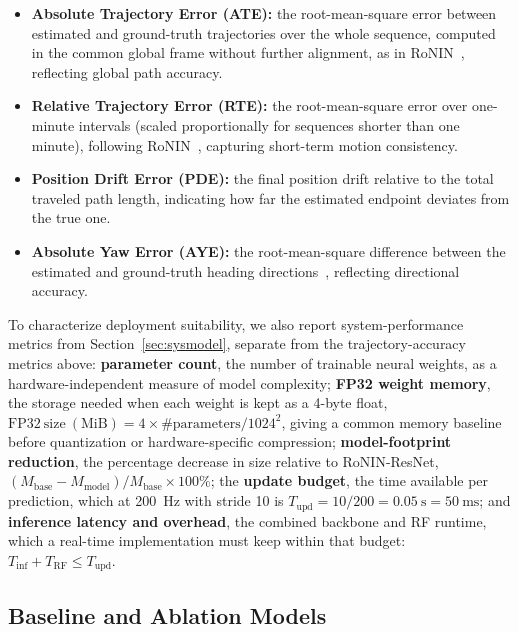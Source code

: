 \documentclass[10pt,conference,letterpaper]{IEEEtran}
\begin{document}
\begin{itemize}
  \item \textbf{Absolute Trajectory Error (ATE):} the root-mean-square
        error between estimated and ground-truth trajectories over the
        whole sequence, computed in the common global frame without
        further alignment, as in RoNIN~\cite{ronin2019}, reflecting
        global path accuracy.

  \item \textbf{Relative Trajectory Error (RTE):} the root-mean-square
        error over one-minute intervals (scaled proportionally for
        sequences shorter than one minute), following
        RoNIN~\cite{ronin2019}, capturing short-term motion consistency.

  \item \textbf{Position Drift Error (PDE):} the final position drift
        relative to the total traveled path length, indicating how far
        the estimated endpoint deviates from the true one.

  \item \textbf{Absolute Yaw Error (AYE):} the root-mean-square
        difference between the estimated and ground-truth heading
        directions~\cite{neurit2024}, reflecting directional accuracy.

\end{itemize}


To characterize deployment suitability, we also report system-performance
metrics from Section~\ref{sec:sysmodel}, separate from the
trajectory-accuracy metrics above: \textbf{parameter count}, the number
of trainable neural weights, as a hardware-independent measure of model
complexity; \textbf{FP32 weight memory}, the storage needed when each
weight is kept as a 4-byte float,
$\mathrm{FP32\ size\ (MiB)} = 4 \times \#\mathrm{parameters}/1024^2$,
giving a common memory baseline before quantization or
hardware-specific compression; \textbf{model-footprint reduction}, the
percentage decrease in size relative to RoNIN-ResNet,
$(M_{\mathrm{base}}-M_{\mathrm{model}})/M_{\mathrm{base}}\times 100\%$;
the \textbf{update budget}, the time available per prediction, which at
200~Hz with stride 10 is $T_{\mathrm{upd}}=10/200=0.05~\mathrm{s}=50~\mathrm{ms}$;
and \textbf{inference latency and overhead}, the combined backbone and
RF runtime, which a real-time implementation must keep within that
budget: $T_{\mathrm{inf}} + T_{\mathrm{RF}} \leq T_{\mathrm{upd}}$.

\subsection{Baseline and Ablation Models}
\end{document}
